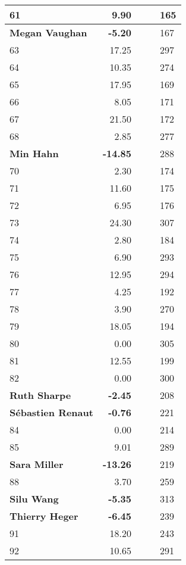\begin{longtable}{|p{5cm}|r|p{9cm}|p{6cm}|l|}
   \hline
61 & 9.90 &  &  & 165 \\ 
   \hline
\textbf{Megan Vaughan} & \textbf{-5.20} &  &  & 167 \\ 
   \hline
63 & 17.25 &  &  & 297 \\ 
   \hline
64 & 10.35 &  &  & 274 \\ 
   \hline
65 & 17.95 &  &  & 169 \\ 
   \hline
66 & 8.05 &  &  & 171 \\ 
   \hline
67 & 21.50 &  &  & 172 \\ 
   \hline
68 & 2.85 &  &  & 277 \\ 
   \hline
\textbf{Min Hahn} & \textbf{-14.85} &  &  & 288 \\ 
   \hline
70 & 2.30 &  &  & 174 \\ 
   \hline
71 & 11.60 &  &  & 175 \\ 
   \hline
72 & 6.95 &  &  & 176 \\ 
   \hline
73 & 24.30 &  &  & 307 \\ 
   \hline
74 & 2.80 &  &  & 184 \\ 
   \hline
75 & 6.90 &  &  & 293 \\ 
   \hline
76 & 12.95 &  &  & 294 \\ 
   \hline
77 & 4.25 &  &  & 192 \\ 
   \hline
78 & 3.90 &  &  & 270 \\ 
   \hline
79 & 18.05 &  &  & 194 \\ 
   \hline
80 & 0.00 &  &  & 305 \\ 
   \hline
81 & 12.55 &  &  & 199 \\ 
   \hline
82 & 0.00 &  &  & 300 \\ 
   \hline
\textbf{Ruth Sharpe} & \textbf{-2.45} &  &  & 208 \\ 
   \hline
\textbf{S\'ebastien Renaut} & \textbf{-0.76} &  &  & 221 \\ 
   \hline
84 & 0.00 &  &  & 214 \\ 
   \hline
85 & 9.01 &  &  & 289 \\ 
   \hline
\textbf{Sara Miller} & \textbf{-13.26} &  &  & 219 \\ 
   \hline
88 & 3.70 &  &  & 259 \\ 
   \hline
\textbf{Silu Wang} & \textbf{-5.35} &  &  & 313 \\ 
   \hline
\textbf{Thierry Heger} & \textbf{-6.45} &  &  & 239 \\ 
   \hline
91 & 18.20 &  &  & 243 \\ 
   \hline
92 & 10.65 &  &  & 291 \\ 
   \hline
\hline
\end{longtable}
